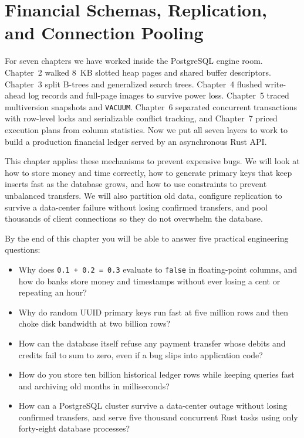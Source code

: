 \chapter{Financial Schemas, Replication, and Connection Pooling}
\label{ch08:capstone}

For seven chapters we have worked inside the PostgreSQL engine room. Chapter~2
walked 8~KB slotted heap pages and shared buffer descriptors. Chapter~3 split
B-trees and generalized search trees. Chapter~4 flushed write-ahead log records
and full-page images to survive power loss. Chapter~5 traced multiversion
snapshots and \texttt{VACUUM}. Chapter~6 separated concurrent transactions with
row-level locks and serializable conflict tracking, and Chapter~7 priced execution
plans from column statistics. Now we put all seven layers to work to build a
production financial ledger served by an asynchronous Rust API.

This chapter applies these mechanisms to prevent expensive bugs. We will look at how to
store money and time correctly, how to generate primary keys that keep inserts fast as
the database grows, and how to use constraints to prevent unbalanced transfers. We will
also partition old data, configure replication to survive a data-center failure without
losing confirmed transfers, and pool thousands of client connections so they do not
overwhelm the database.

\begin{focusbox}
By the end of this chapter you will be able to answer five practical engineering questions:
\begin{itemize}
  \item Why does \texttt{0.1 + 0.2 = 0.3} evaluate to \texttt{false} in floating-point columns, and how do banks store money and timestamps without ever losing a cent or repeating an hour?
  \item Why do random UUID primary keys run fast at five million rows and then choke disk bandwidth at two billion rows?
  \item How can the database itself refuse any payment transfer whose debits and credits fail to sum to zero, even if a bug slips into application code?
  \item How do you store ten billion historical ledger rows while keeping queries fast and archiving old months in milliseconds?
  \item How can a PostgreSQL cluster survive a data-center outage without losing confirmed transfers, and serve five thousand concurrent Rust tasks using only forty-eight database processes?
\end{itemize}
\end{focusbox}

